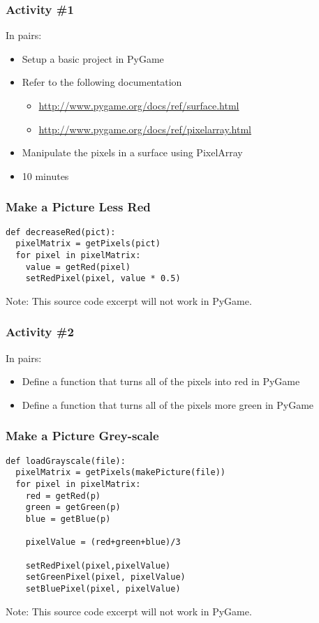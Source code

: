 \begin{frame}
	\frametitle{Activity \#1}
	
	In pairs:
	
	\vspace{2em}
	
	\begin{itemize}		
		\item Setup a basic project in PyGame
		\item Refer to the following documentation
		\begin{itemize}
			\item \url{http://www.pygame.org/docs/ref/surface.html}
			\item \url{http://www.pygame.org/docs/ref/pixelarray.html}
		\end{itemize}
		\item Manipulate the pixels in a surface using PixelArray
		\item 10 minutes
	\end{itemize}
\end{frame}

\begin{frame}[fragile]
	\frametitle{Make a Picture Less Red}
	
\begin{lstlisting}
def decreaseRed(pict):
  pixelMatrix = getPixels(pict)
  for pixel in pixelMatrix:
    value = getRed(pixel)
    setRedPixel(pixel, value * 0.5)
\end{lstlisting}

Note: This source code excerpt will not work in PyGame.

\end{frame}

\begin{frame}
	\frametitle{Activity \#2}
	
	In pairs:
	
	\vspace{2em}
	
	\begin{itemize}
		\item Define a function that turns all of the pixels into red in PyGame
		\item Define a function that turns all of the pixels more green in PyGame
	\end{itemize}
\end{frame}

\begin{frame}[fragile]
	\frametitle{Make a Picture Grey-scale}
	
\begin{lstlisting}
def loadGrayscale(file):
  pixelMatrix = getPixels(makePicture(file))
  for pixel in pixelMatrix:
    red = getRed(p)
    green = getGreen(p)
    blue = getBlue(p)
    
    pixelValue = (red+green+blue)/3
    
    setRedPixel(pixel,pixelValue)
    setGreenPixel(pixel, pixelValue)
    setBluePixel(pixel, pixelValue)
\end{lstlisting}

Note: This source code excerpt will not work in PyGame.

\end{frame}

